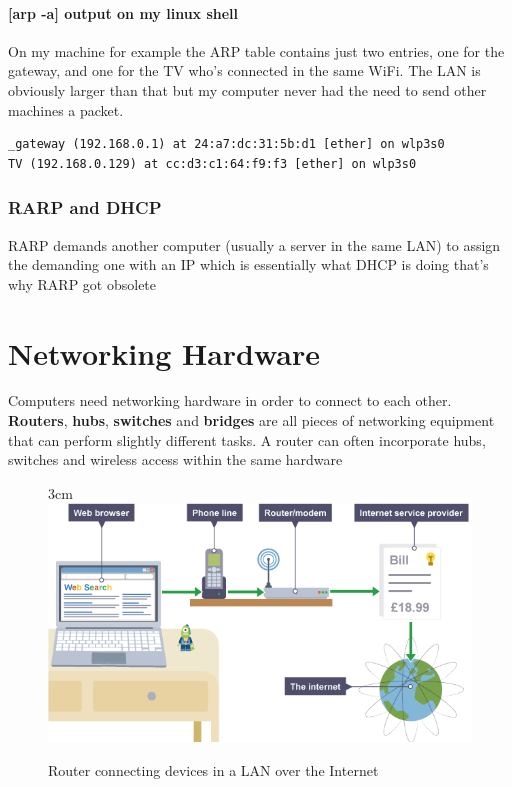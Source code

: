 \documentclass[a4paper,12pt]{book}
\begin{document}
\paragraph{[arp -a] output on my linux shell}
On my machine for example the ARP table contains just two entries, one for the gateway, and one for the TV who's connected in the same WiFi. The LAN is obviously larger than that but my computer never had the need to send other machines a packet.

\begin{lstlisting}
_gateway (192.168.0.1) at 24:a7:dc:31:5b:d1 [ether] on wlp3s0
TV (192.168.0.129) at cc:d3:c1:64:f9:f3 [ether] on wlp3s0
\end{lstlisting}

\subsubsection{RARP and DHCP}
RARP demands another computer (usually a server in the same LAN) to assign the demanding one with an IP which is essentially what DHCP is doing that's why RARP got obsolete

\clearpage

\section{Networking Hardware}
Computers need networking hardware in order to connect to each other. \textbf{Routers}, \textbf{hubs}, \textbf{switches} and \textbf{bridges} are all pieces of networking equipment that can perform slightly different tasks. A router can often incorporate hubs, switches and wireless access within the same hardware

\begin{figure}[18]{3cm}
\centering
\includegraphics[width=14cm]{./large.PNG}
\caption{Router connecting devices in a LAN over the Internet}\label{wrap-fig:4}
\end{figure}
\end{document}
